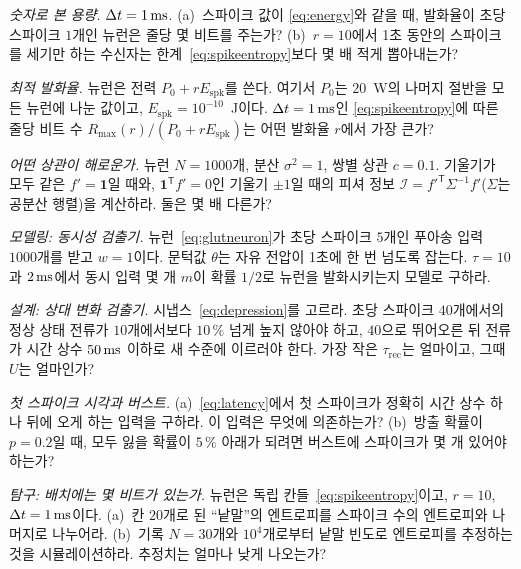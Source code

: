\begin{exercise}[\lvlA]
\label{ex:04:1}
\emph{숫자로 본 용량.} $\Delta t=1\,\text{ms}$. (a)~스파이크 값이 \eqref{eq:energy}와 같을 때, 발화율이 초당 스파이크 $1$개인 뉴런은 줄당 몇 비트를 주는가? (b)~$r=10$에서 1초 동안의 스파이크를 세기만 하는 수신자는 한계~\eqref{eq:spikeentropy}보다 몇 배 적게 뽑아내는가?
\end{exercise}

\begin{exercise}[\lvlB]
\label{ex:04:2}
\emph{최적 발화율.} 뉴런은 전력 $P_0+rE_{\text{spk}}$를 쓴다. 여기서 $P_0$는 $20$~W의 나머지 절반을 모든 뉴런에 나눈 값이고, $E_{\text{spk}}=10^{-10}$~J이다. $\Delta t=1\,\text{ms}$인 \eqref{eq:spikeentropy}에 따른 줄당 비트 수 $R_{\max}(r)/(P_0+rE_{\text{spk}})$는 어떤 발화율 $r$에서 가장 큰가?
\end{exercise}

\begin{exercise}[\lvlB]
\label{ex:04:3}
\emph{어떤 상관이 해로운가.} 뉴런 $N=1000$개, 분산 $\sigma^2=1$, 쌍별 상관 $c=0.1$. 기울기가 모두 같은 $f'=\mathbf 1$일 때와, $\mathbf 1^{\mathsf T}f'=0$인 기울기 $\pm1$일 때의 피셔 정보 $\mathcal I=f'^{\mathsf T}\Sigma^{-1}f'$($\Sigma$는 공분산 행렬)을 계산하라. 둘은 몇 배 다른가?
\end{exercise}

\begin{exercise}[\lvlB]
\label{ex:04:4}
\emph{모델링: 동시성 검출기.} 뉴런~\eqref{eq:glutneuron}가 초당 스파이크 $5$개인 푸아송 입력 $1000$개를 받고 $w=1$이다. 문턱값 $\theta$는 자유 전압이 1초에 한 번 넘도록 잡는다. $\tau=10$과 $2\,\text{ms}$에서 동시 입력 몇 개 $m$이 확률 $1/2$로 뉴런을 발화시키는지 모델로 구하라.
\end{exercise}

\begin{exercise}[\lvlB]
\label{ex:04:5}
\emph{설계: 상대 변화 검출기.} 시냅스~\eqref{eq:depression}를 고르라. 초당 스파이크 $40$개에서의 정상 상태 전류가 $10$개에서보다 $10\,\%$ 넘게 높지 않아야 하고, $40$으로 뛰어오른 뒤 전류가 시간 상수 $50\,\text{ms}$ 이하로 새 수준에 이르러야 한다. 가장 작은 $\tau_{\text{rec}}$는 얼마이고, 그때 $U$는 얼마인가?
\end{exercise}

\begin{exercise}[\lvlA]
\label{ex:04:6}
\emph{첫 스파이크 시각과 버스트.} (a)~\eqref{eq:latency}에서 첫 스파이크가 정확히 시간 상수 하나 뒤에 오게 하는 입력을 구하라. 이 입력은 무엇에 의존하는가? (b)~방출 확률이 $p=0.2$일 때, 모두 잃을 확률이 $5\,\%$ 아래가 되려면 버스트에 스파이크가 몇 개 있어야 하는가?
\end{exercise}

\begin{exercise}[\lvlC]
\label{ex:04:7}
\emph{탐구: 배치에는 몇 비트가 있는가.} 뉴런은 독립 칸들~\eqref{eq:spikeentropy}이고, $r=10$, $\Delta t=1\,\text{ms}$이다. (a)~칸 $20$개로 된 “낱말”의 엔트로피를 스파이크 수의 엔트로피와 나머지로 나누어라. (b)~기록 $N=30$개와 $10^4$개로부터 낱말 빈도로 엔트로피를 추정하는 것을 시뮬레이션하라. 추정치는 얼마나 낮게 나오는가?
\end{exercise}
